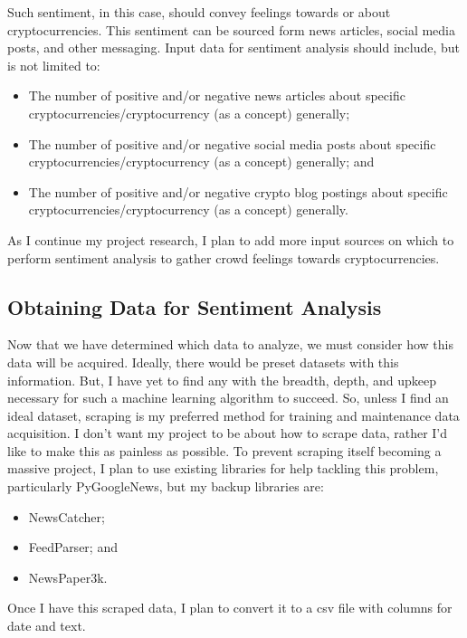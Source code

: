 \documentclass[10pt,twocolumn]{article}
\begin{document}
Such sentiment, in this case, should convey feelings towards or about cryptocurrencies. This sentiment can be sourced form news articles, social media posts, and other messaging. Input data for sentiment analysis should include, but is not limited to:

\begin{itemize}
    \item The number of positive and/or negative news articles about specific cryptocurrencies/cryptocurrency (as a concept) generally;
    \item The number of positive and/or negative social media posts about specific cryptocurrencies/cryptocurrency (as a concept) generally; and
    \item The number of positive and/or negative crypto blog postings about specific cryptocurrencies/cryptocurrency (as a concept) generally.
\end{itemize}

As I continue my project research, I plan to add more input sources on which to perform sentiment analysis to gather crowd feelings towards cryptocurrencies.

\subsection{Obtaining Data for Sentiment Analysis}

Now that we have determined which data to analyze, we must consider how this data will be acquired. Ideally, there would be preset datasets with this information. But, I have yet to find any with the breadth, depth, and upkeep necessary for such a machine learning algorithm to succeed. So, unless I find an ideal dataset, scraping is my preferred method for training and maintenance data acquisition. I don’t want my project to be about how to scrape data, rather I’d like to make this as painless as possible. To prevent scraping itself becoming a massive project, I plan to use existing libraries for help tackling this problem, particularly PyGoogleNews, but my backup libraries are:

\begin{itemize}
    \item NewsCatcher;
    \item FeedParser; and
    \item NewsPaper3k.
\end{itemize}

Once I have this scraped data, I plan to convert it to a csv file with columns for date and text.
\end{document}
